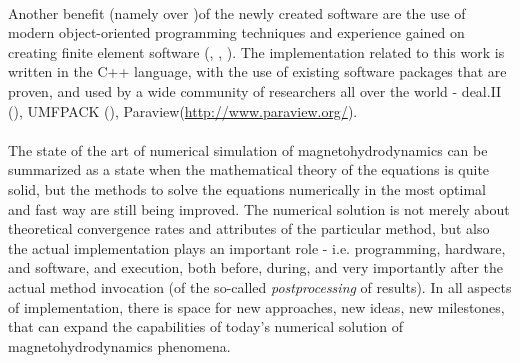 \paragraph{}
Another benefit (namely over \cite{zeus})of the newly created software are the use of modern object-oriented programming techniques and experience gained on creating finite element software (\cite{ja1}, \cite{ja2}, \cite{ja3}).
The implementation related to this work is written in the C++ language, with the use of existing software packages that are proven, and used by a wide community of researchers all over the world - deal.II (\cite{deal}), UMFPACK (\cite{umfpack}), Paraview(\url{http://www.paraview.org/}).

\paragraph{}
The state of the art of numerical simulation of magnetohydrodynamics can be summarized as a state when the mathematical theory of the equations is quite solid, but the methods to solve the equations numerically in the most optimal and fast way are still being improved. The numerical solution is not merely about theoretical convergence rates and attributes of the particular method, but also the actual implementation plays an important role - i.e. programming, hardware, and software, and execution, both before, during, and very importantly after the actual method invocation (of the so-called \textit{postprocessing} of results). In all aspects of implementation, there is space for new approaches, new ideas, new milestones, that can expand the capabilities of today's numerical solution of magnetohydrodynamics phenomena.